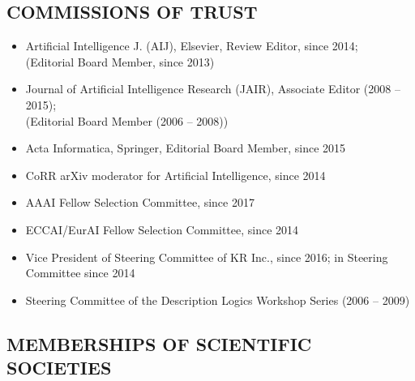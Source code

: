 \subsection*{COMMISSIONS OF TRUST}
\vspace{-1ex}
\begin{itemize}
\item Artificial Intelligence J. (AIJ), Elsevier, Review Editor, since 2014;\\
(Editorial Board Member, since 2013)
\item  Journal 
of Artificial Intelligence Research (JAIR), Associate Editor (2008 -- 2015);\\
(Editorial Board Member (2006 -- 2008))
\item  Acta Informatica, Springer, Editorial Board Member, since 2015
\item  CoRR arXiv moderator for Artificial Intelligence, since 2014

\item AAAI Fellow Selection Committee, since 2017
\item ECCAI/EurAI Fellow Selection Committee, since 2014
\item Vice President of Steering Committee of KR Inc., since 2016; in Steering Committee since 2014
\item  Steering Committee of the Description Logics Workshop Series (2006 -- 2009)
\end{itemize}


\vspace{-1ex}
\subsection*{MEMBERSHIPS OF SCIENTIFIC SOCIETIES}
\vspace{-1ex}

